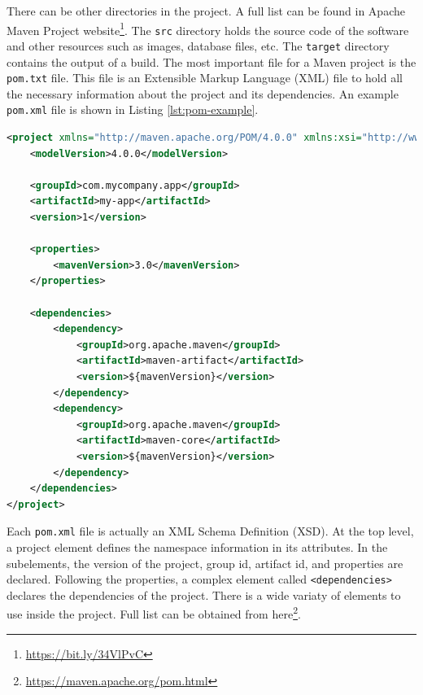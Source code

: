 There can be other directories in the project. A full list can be found in Apache Maven Project website\footnote{\url{https://bit.ly/34VlPvC}}. The \verb|src| directory holds the source code of the software and other resources such as images, database files, etc. The \verb|target| directory contains the output of a build. The most important file for a Maven project is the \verb|pom.txt| file. This file is an Extensible Markup Language (XML) file to hold all the necessary information about the project and its dependencies. An example \verb|pom.xml| file is shown in Listing \ref{lst:pom-example}.

\begin{lstlisting}[language=XML,caption={An example pom.xml file.},label=lst:pom-example]
<project xmlns="http://maven.apache.org/POM/4.0.0" xmlns:xsi="http://www.w3.org/2001/XMLSchema-instance" xsi:schemaLocation="http://maven.apache.org/POM/4.0.0 http://maven.apache.org/xsd/maven-4.0.0.xsd">
    <modelVersion>4.0.0</modelVersion>
 
    <groupId>com.mycompany.app</groupId>
    <artifactId>my-app</artifactId>
    <version>1</version>
    
    <properties>
        <mavenVersion>3.0</mavenVersion>
    </properties>
 
    <dependencies>
        <dependency>
            <groupId>org.apache.maven</groupId>
            <artifactId>maven-artifact</artifactId>
            <version>${mavenVersion}</version>
        </dependency>
        <dependency>
            <groupId>org.apache.maven</groupId>
            <artifactId>maven-core</artifactId>
            <version>${mavenVersion}</version>
        </dependency>
    </dependencies>
</project>
\end{lstlisting}

Each \verb|pom.xml| file is actually an XML Schema Definition (XSD). At the top level, a project element defines the namespace information in its attributes. In the subelements, the version of the project, group id, artifact id, and properties are declared. Following the properties, a complex element called \verb|<dependencies>| declares the dependencies of the project. There is a wide variaty of elements to use inside the project. Full list can be obtained from here\footnote{\url{https://maven.apache.org/pom.html}}.

